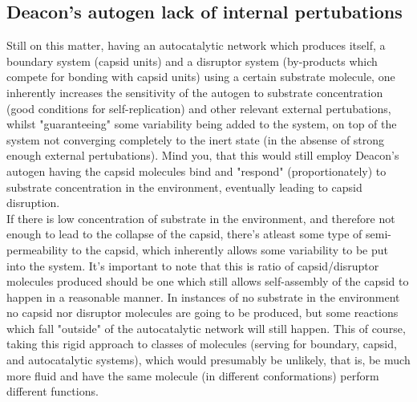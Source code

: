 \documentclass[a4paper,12pt,twoside,leqno]{article}
\begin{document}
\subsection*{Deacon's autogen lack of internal pertubations}
Still on this matter, having an autocatalytic network which produces itself, a boundary system (capsid units) and a disruptor system (by-products which compete for bonding with capsid units) using a certain substrate molecule, one inherently increases the sensitivity of the autogen to substrate concentration (good conditions for self-replication) and other relevant external pertubations, whilst "guaranteeing" some variability being added to the system, on top of the system not converging completely to the inert state (in the absense of strong enough external pertubations). Mind you, that this would still employ Deacon's autogen having the capsid molecules bind and "respond" (proportionately) to substrate concentration in the environment, eventually leading to capsid disruption.\\
If there is low concentration of substrate in the environment, and therefore not enough to lead to the collapse of the capsid, there's atleast some type of semi-permeability to the capsid, which inherently allows some variability to be put into the system. It's important to note that this is ratio of capsid/disruptor molecules produced should be one which still allows self-assembly of the capsid to happen in a reasonable manner. In instances of no substrate in the environment no capsid nor disruptor molecules are going to be produced, but some reactions which fall "outside" of the autocatalytic network will still happen. This of course, taking this rigid approach to classes of molecules (serving for boundary, capsid, and autocatalytic systems), which would presumably be unlikely, that is, be much more fluid and have the same molecule (in different conformations) perform different functions.
\end{document}
